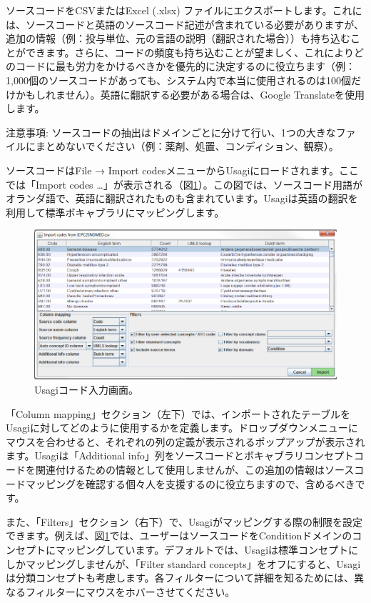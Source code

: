 \documentclass[
  11pt]{book}
\theoremstyle{definition}
\theoremstyle{definition}
\theoremstyle{definition}
\theoremstyle{definition}
\theoremstyle{remark}
\begin{document}
ソースコードをCSVまたはExcel (.xlsx) ファイルにエクスポートします。これには、ソースコードと英語のソースコード記述が含まれている必要がありますが、追加の情報（例：投与単位、元の言語の説明（翻訳された場合））も持ち込むことができます。さらに、コードの頻度も持ち込むことが望ましく、これによりどのコードに最も労力をかけるべきかを優先的に決定するのに役立ちます（例：1,000個のソースコードがあっても、システム内で本当に使用されるのは100個だけかもしれません）。英語に翻訳する必要がある場合は、Google Translateを使用します。

注意事項: ソースコードの抽出はドメインごとに分けて行い、1つの大きなファイルにまとめないでください（例：薬剤、処置、コンディション、観察）。

ソースコードはFile → Import codesメニューからUsagiにロードされます。ここでは「Import codes \ldots」が表示される（図\ref{fig:usagiImport}）。この図では、ソースコード用語がオランダ語で、英語に翻訳されたものも含まれています。Usagiは英語の翻訳を利用して標準ボキャブラリにマッピングします。

\begin{figure}

{\centering \includegraphics[width=1\linewidth]{images/ExtractTransformLoad/usagiImport} 

}

\caption{Usagiコード入力画面。}\label{fig:usagiImport}
\end{figure}

「Column mapping」セクション（左下）では、インポートされたテーブルをUsagiに対してどのように使用するかを定義します。ドロップダウンメニューにマウスを合わせると、それぞれの列の定義が表示されるポップアップが表示されます。Usagiは「Additional info」列をソースコードとボキャブラリコンセプトコードを関連付けるための情報として使用しませんが、この追加の情報はソースコードマッピングを確認する個々人を支援するのに役立ちますので、含めるべきです。

また、「Filters」セクション（右下）で、Usagiがマッピングする際の制限を設定できます。例えば、図\ref{fig:usagiImport}では、ユーザーはソースコードをConditionドメインのコンセプトにマッピングしています。デフォルトでは、Usagiは標準コンセプトにしかマッピングしませんが、「Filter standard concepts」をオフにすると、Usagiは分類コンセプトも考慮します。各フィルターについて詳細を知るためには、異なるフィルターにマウスをホバーさせてください。
\end{document}
